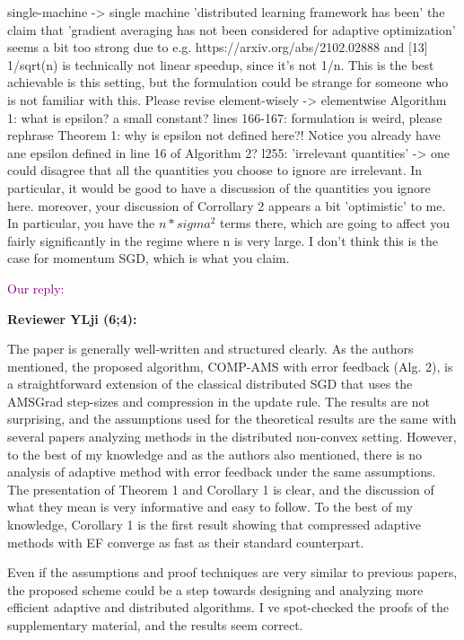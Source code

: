 \documentclass{article}
\begin{document}
single-machine -> single machine
'distributed learning framework has been'
the claim that 'gradient averaging has not been considered for adaptive optimization' seems a bit too strong due to e.g. https://arxiv.org/abs/2102.02888 and [13]
1/sqrt(n) is technically not linear speedup, since it's not 1/n. This is the best achievable is this setting, but the formulation could be strange for someone who is not familiar with this. Please revise
element-wisely -> elementwise
Algorithm 1: what is epsilon? a small constant?
lines 166-167: formulation is weird, please rephrase
Theorem 1: why is epsilon not defined here?! Notice you already have ane epsilon defined in line 16 of Algorithm 2?
l255: 'irrelevant quantities' -> one could disagree that all the quantities you choose to ignore are irrelevant. In particular, it would be good to have a discussion of the quantities you ignore here.
moreover, your discussion of Corrollary 2 appears a bit 'optimistic' to me. In particular, you have the $n * sigma^2$ terms there, which are going to affect you fairly significantly in the regime where n is very large. I don't think this is the case for momentum SGD, which is what you claim.


\textcolor{purple}{Our reply:}



\textbf{Reviewer YLji (6;4):}


The paper is generally well-written and structured clearly. As the authors mentioned, the proposed algorithm, COMP-AMS with error feedback (Alg. 2), is a straightforward extension of the classical distributed SGD that uses the AMSGrad step-sizes and compression in the update rule. The results are not surprising, and the assumptions used for the theoretical results are the same with several papers analyzing methods in the distributed non-convex setting. However, to the best of my knowledge and as the authors also mentioned, there is no analysis of adaptive method with error feedback under the same assumptions. The presentation of Theorem 1 and Corollary 1 is clear, and the discussion of what they mean is very informative and easy to follow. To the best of my knowledge, Corollary 1 is the first result showing that compressed adaptive methods with EF converge as fast as their standard counterpart.

Even if the assumptions and proof techniques are very similar to previous papers, the proposed scheme could be a step towards designing and analyzing more efficient adaptive and distributed algorithms. I ve spot-checked the proofs of the supplementary material, and the results seem correct.
\end{document}
